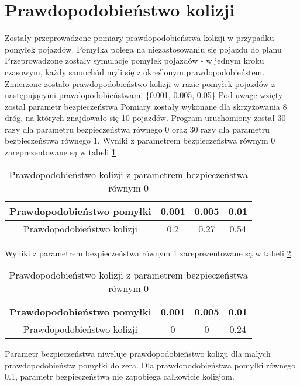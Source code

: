 \section{Prawdopodobieństwo kolizji}
Zostały przeprowadzone pomiary prawdopodobieństwa kolizji w przypadku pomyłek pojazdów.
\newline
\newline
Pomyłka polega na niezastosowaniu się pojazdu do planu
\newline
\newline
Przeprowadzone zostały symulacje pomyłek pojazdów - w jednym kroku czasowym, każdy samochód myli się z określonym prawdopodobieństem.
\newline
\newline
Zmierzone zostało prawdopodobieństwo kolizji w razie pomyłek pojazdów z następującymi prawdopodobieństwami \{0.001, 0.005, 0.05\}
\newline
\newline
Pod uwage wzięty został parametr bezpieczeństwa
\newline
\newline
Pomiary zostały wykonane dla skrzyżowania 8 dróg, na których znajdowało się 10 pojazdów. Program uruchomiony został 30 razy dla parametru bezpieczeństwa równego 0 oraz 30 razy dla parametru bezpieczeństwa równego 1.
\newline
\newline
Wyniki z parametrem bezpieczeństwa równym 0 zareprezentowane są w tabeli \ref{firstCollision}
\begin{table}[H]
    \centering
    \begin{tabular}{|c|c|c|c|}
      \hline 
      Prawdopodobieństwo pomyłki & 0.001 & 0.005 & 0.01 \\
      \hline
      Prawdopodobieństwo kolizji & 0.2 & 0.27 & 0.54 \\
      \hline
    \end{tabular} 
    \caption{Prawdopodobieństwo kolizji z parametrem bezpieczeństwa równym 0}
    \label{firstCollision}
\end{table}
Wyniki z parametrem bezpieczeństwa równym 1 zareprezentowane są w tabeli \ref{secondCollision}
\begin{table}[H]
    \centering
    \begin{tabular}{|c|c|c|c|}
      \hline 
      Prawdopodobieństwo pomyłki & 0.001 & 0.005 & 0.01 \\
      \hline
      Prawdopodobieństwo kolizji & 0 & 0 & 0.24 \\
      \hline
    \end{tabular} 
    \caption{Prawdopodobieństwo kolizji z parametrem bezpieczeństwa równym 0}
    \label{secondCollision}
\end{table}
Parametr bezpieczeństwa niweluje prawdopodobieństwo kolizji dla małych prawdopodobieństw pomyłki do zera.
\newline
\newline
Dla prawdopodobieństwa pomyłki równego 0.1, parametr bezpieczeństwa nie zapobiega całkowicie kolizjom.

